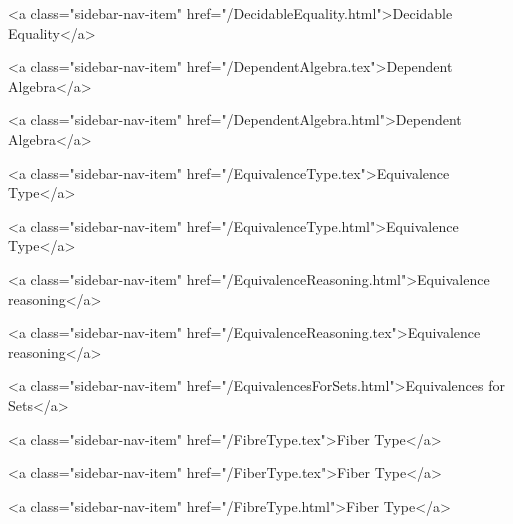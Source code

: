       
    
      
        
          <a class="sidebar-nav-item" href="/DecidableEquality.html">Decidable Equality</a>
        
      
    
      
        
          <a class="sidebar-nav-item" href="/DependentAlgebra.tex">Dependent Algebra</a>
        
      
    
      
        
          <a class="sidebar-nav-item" href="/DependentAlgebra.html">Dependent Algebra</a>
        
      
    
      
        
          <a class="sidebar-nav-item" href="/EquivalenceType.tex">Equivalence Type</a>
        
      
    
      
        
          <a class="sidebar-nav-item" href="/EquivalenceType.html">Equivalence Type</a>
        
      
    
      
        
          <a class="sidebar-nav-item" href="/EquivalenceReasoning.html">Equivalence reasoning</a>
        
      
    
      
        
          <a class="sidebar-nav-item" href="/EquivalenceReasoning.tex">Equivalence reasoning</a>
        
      
    
      
        
          <a class="sidebar-nav-item" href="/EquivalencesForSets.html">Equivalences for Sets</a>
        
      
    
      
        
          <a class="sidebar-nav-item" href="/FibreType.tex">Fiber Type</a>
        
      
    
      
        
          <a class="sidebar-nav-item" href="/FiberType.tex">Fiber Type</a>
        
      
    
      
        
          <a class="sidebar-nav-item" href="/FibreType.html">Fiber Type</a>
        
